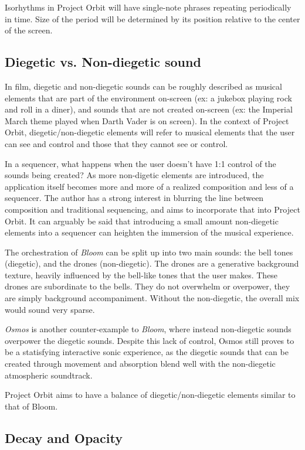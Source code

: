 \documentclass[11pt, twocolumn]{article}
\begin{document}
Isorhythms in Project Orbit will have single-note phrases repeating periodically in time. Size
of the period will be determined by its position relative to the center of the screen.

\subsection{Diegetic vs. Non-diegetic sound}

In film, diegetic and non-diegetic sounds can be roughly described as musical elements that 
are part of the environment on-screen (ex: a jukebox playing rock and roll in a diner), 
and sounds that are not created on-screen (ex: the Imperial March theme played when Darth Vader is on screen).
In the context of Project Orbit, diegetic/non-diegetic elements will refer to musical elements that 
the user can see and control and those that they cannot see or control.

In a sequencer, what happens when the user doesn't have 1:1 control of the sounds being created?
As more non-digetic elements are introduced, the application itself becomes more and more
of a realized composition and less of a sequencer. 
The author has a strong interest in blurring the line between composition and
traditional sequencing, and aims to incorporate that into Project Orbit. 
It can arguably be said that introducing a small amount non-diegetic elements into a
sequencer can heighten the immersion of the musical experience. 

The orchestration of \emph{Bloom} can be split up into two main sounds: the bell tones 
(diegetic), and the drones (non-diegetic). The drones are a generative background texture,
heavily influenced by the bell-like tones that the user makes. These drones are subordinate to 
the bells. They do not overwhelm or overpower, they are simply background accompaniment. 
Without the non-diegetic, the overall mix would sound very sparse.

\emph{Osmos} is another counter-example to \emph{Bloom}, where instead non-diegetic sounds
overpower the diegetic sounds. Despite this lack of control, Osmos still
proves to be a statisfying interactive sonic experience, as the diegetic sounds that can be created through
movement and absorption blend well with the non-diegetic atmospheric 
soundtrack.

Project Orbit aims to have a balance of diegetic/non-diegetic elements similar
to that of Bloom.


\subsection{Decay and Opacity}
\end{document}
